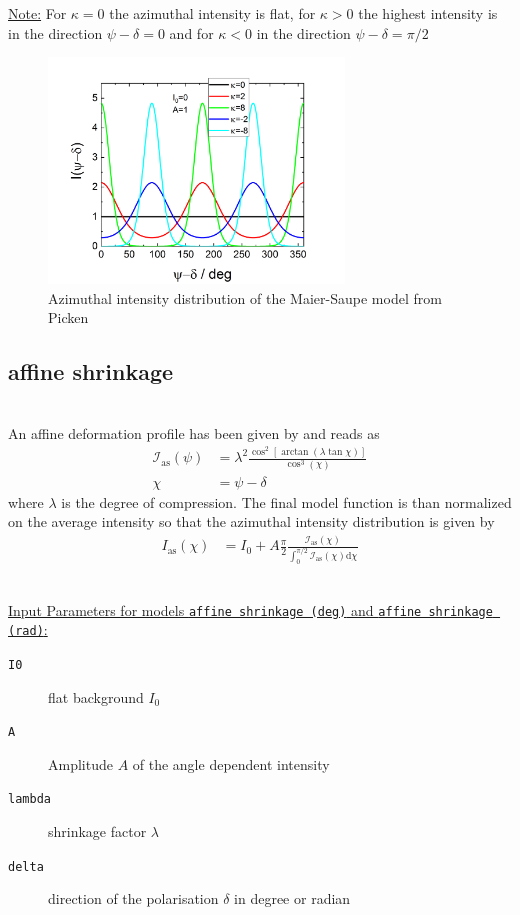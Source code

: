 \underline{Note:}
For $\kappa=0$ the azimuthal intensity is flat, for $\kappa>0$ the highest intensity is in the direction $\psi-\delta=0$ and for $\kappa<0$ in the direction $\psi-\delta=\pi/2$

\begin{figure}[htb]
\begin{center}
\includegraphics[width=0.7\textwidth]{../images/form_factor/azimuthal/maiersaupe.png}
\end{center}
\caption{Azimuthal intensity distribution of the Maier-Saupe model from Picken \cite{Picken1990}}
\label{fig:maiersaupe}
\end{figure}

\subsection{affine shrinkage} ~\\
An affine deformation  profile has been given by \cite{Vilcinskas2015,Zlopasa2015} and reads as
\begin{align}
\mathcal{I}_\mathrm{as}(\psi) &= \lambda^2\frac{\cos^2\left[\arctan\left(\lambda \tan \chi\right)\right]}{\cos^3(\chi)} \\
\chi &= \psi-\delta
\end{align}
where $\lambda$ is the degree of compression. The final model function is than normalized on the average intensity so that the azimuthal intensity distribution is given by
\begin{align}
  I_\mathrm{as}(\chi) &= I_0 + A \frac{\pi}{2}\frac{\mathcal{I}_\mathrm{as}(\chi)}{\int_0^{\pi/2}\mathcal{I}_\mathrm{as}(\chi)\mathrm{d}\chi}
\end{align}

\hspace{1pt}\\
\underline{Input Parameters for models \texttt{affine shrinkage (deg)} and \texttt{affine shrinkage (rad)}:}\\
\begin{description}
\item[\texttt{I0}] flat background $I_0$
\item[\texttt{A}] Amplitude $A$ of the angle dependent intensity
\item[\texttt{lambda}] shrinkage factor $\lambda$
\item[\texttt{delta}] direction of the polarisation $\delta$ in degree or radian
\end{description}

